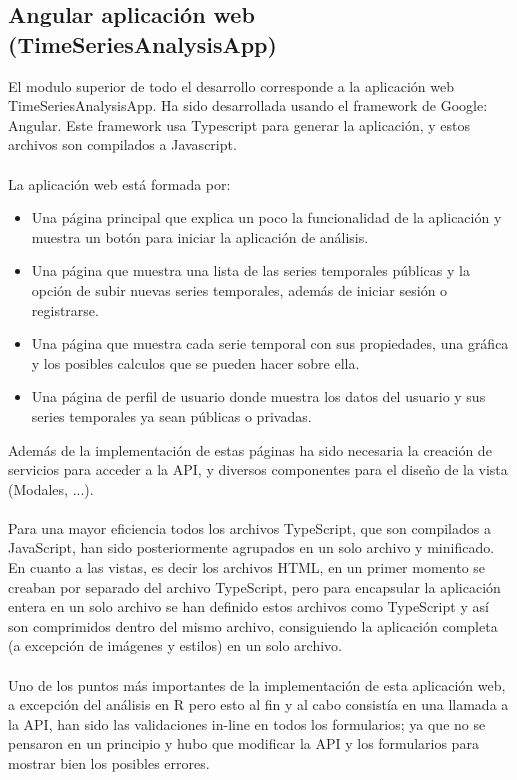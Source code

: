 \documentclass[14pt]{extarticle}
\theoremstyle{definition}
\theoremstyle{remark}
\begin{document}
\subsection{Angular aplicación web (TimeSeriesAnalysisApp)}\label{sec:angularaplicacionweb}
El modulo superior de todo el desarrollo corresponde a la aplicación web TimeSeriesAnalysisApp. Ha sido desarrollada usando el framework de Google: Angular. Este framework usa Typescript para generar la aplicación, y estos archivos son compilados a Javascript.\\\\La aplicación web está formada por:
\begin{itemize}
	\item Una página principal que explica un poco la funcionalidad de la aplicación y muestra un botón para iniciar la aplicación de análisis.
	\item Una página que muestra una lista de las series temporales públicas y la opción de subir nuevas series temporales, además de iniciar sesión o registrarse.
	\item Una página que muestra cada serie temporal con sus propiedades, una gráfica y los posibles calculos que se pueden hacer sobre ella.
	\item Una página de perfil de usuario donde muestra los datos del usuario y sus series temporales ya sean públicas o privadas.
\end{itemize}
Además de la implementación de estas páginas ha sido necesaria la creación de servicios para acceder a la API, y diversos componentes para el diseño de la vista (Modales, ...).\\\\Para una mayor eficiencia todos los archivos TypeScript, que son compilados a JavaScript, han sido posteriormente agrupados en un solo archivo y minificado.\\En cuanto a las vistas, es decir los archivos HTML, en un primer momento se creaban por separado del archivo TypeScript, pero para encapsular la aplicación entera en un solo archivo se han definido estos archivos como TypeScript y así son comprimidos dentro del mismo archivo, consiguiendo la aplicación completa (a excepción de imágenes y estilos) en un solo archivo.\\\\Uno de los puntos más importantes de la implementación de esta aplicación web, a excepción del análisis en R pero esto al fin y al cabo consistía en una llamada a la API, han sido las validaciones in-line en todos los formularios; ya que no se pensaron en un principio y hubo que modificar la API y los formularios para mostrar bien los posibles errores.
\end{document}
